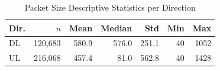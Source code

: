 \begin{table}[htbp]
\centering
\caption{Packet Size Descriptive Statistics per Direction}\label{tab:dir_desc}
\begin{tabular}{lrrrrrr}
\toprule
\textbf{Dir.} & \textbf{$n$} & \textbf{Mean} & \textbf{Median} & \textbf{Std} & \textbf{Min} & \textbf{Max} \\
\midrule
DL & 120,683 & 580.9 & 576.0 & 251.1 & 40 & 1052 \\
UL & 216,068 & 457.4 & 81.0 & 562.8 & 40 & 1428 \\
\bottomrule
\end{tabular}
\end{table}
